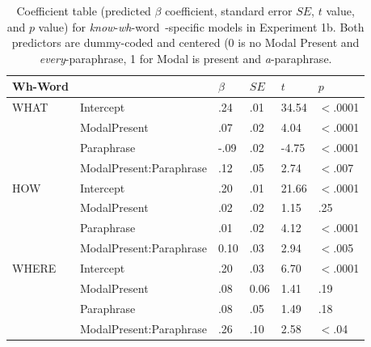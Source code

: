 \documentclass[12pt,letterpaper,table,svgnames,dvipsnames]{article}
\newcommand{\whw}{\emph{wh}-word~}
\begin{document}
\begin{table}[p!]
\begin{center} 
\caption{Coefficient table (predicted $\beta$ coefficient, standard error $SE$, $t$ value, and $p$ value) for \emph{know}-\whw-specific models in Experiment 1b. Both predictors are dummy-coded and centered (0 is no Modal Present and \emph{every}-paraphrase, 1 for Modal is present and \emph{a}-paraphrase.} 
\label{sub-model_res_ex1b} 
\begin{tabular}{llllll} 
\toprule
Wh-Word & {} & $\beta$ & $SE$ & $t$ & $p$\\
\midrule
WHAT & Intercept & .24 & .01 & 34.54 & $<$.0001\\
{} & ModalPresent & .07 & .02 & 4.04 & $<$.0001\\
{} & Paraphrase & -.09 & .02 & -4.75 & $<$.0001\\
{} & ModalPresent:Paraphrase & .12 & .05 & 2.74 & $<$.007\\


\midrule
HOW & Intercept & .20 & .01 & 21.66 & $<$.0001\\
{} & ModalPresent & .02 & .02 & 1.15 & .25\\
{} & Paraphrase & .01 & .02 & 4.12 & $<$.0001\\
{} & ModalPresent:Paraphrase & 0.10 & .03 & 2.94 & $<$.005\\


\midrule
WHERE & Intercept & .20 & .03 & 6.70 & $<$.0001\\
{} & ModalPresent & .08 & 0.06 & 1.41 & .19\\
{} & Paraphrase & .08 & .05 & 1.49 & .18\\
{} & ModalPresent:Paraphrase & .26 & .10 & 2.58 & $<$.04\\


\end{tabular}
\end{center}
\end{table}
\end{document}
